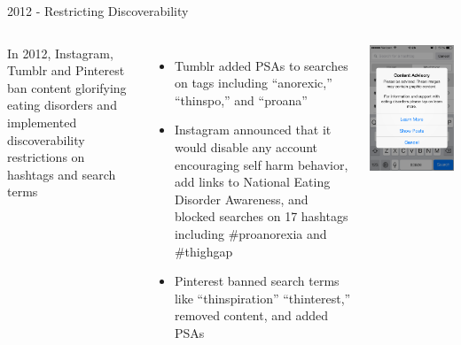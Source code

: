 \documentclass[nobackground,dvipsnames,table,aspectratio=169]{beamer}
\begin{document}
\begin{frame}{2012 - Restricting Discoverability}
    \begin{columns}
            \small
            In 2012, Instagram, Tumblr and Pinterest ban content glorifying eating disorders and implemented discoverability restrictions on hashtags and search terms\\
            \begin{itemize}
                \footnotesize
                \item Tumblr added PSAs to searches on tags including “anorexic,” “thinspo,” and “proana”
                \item Instagram announced that it would disable any account encouraging self harm behavior, add links to National Eating Disorder Awareness, and blocked searches on 17 hashtags including \#proanorexia and \#thighgap
                \item Pinterest banned search terms like “thinspiration” “thinterest,” removed content, and added PSAs
            \end{itemize}
            \includegraphics[width=\textwidth]{restricted-discoverability}
    \end{columns}
\end{frame}
\end{document}
